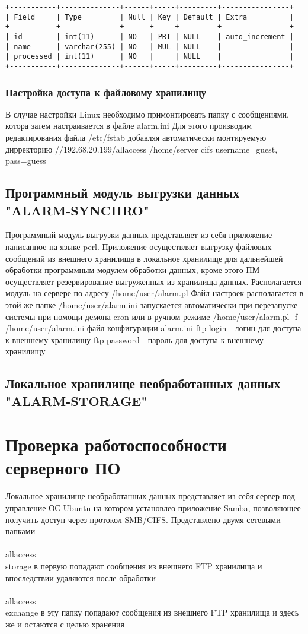 \documentclass[12pt]{article}[a4paper,14pt,russian]
\begin{document}
\begin{verbatim}
+-----------+--------------+------+-----+---------+----------------+
| Field     | Type         | Null | Key | Default | Extra          |
+-----------+--------------+------+-----+---------+----------------+
| id        | int(11)      | NO   | PRI | NULL    | auto_increment |
| name      | varchar(255) | NO   | MUL | NULL    |                |
| processed | int(11)      | NO   |     | NULL    |                |
+-----------+--------------+------+-----+---------+----------------+

\end{verbatim}
	\subsubsection{Настройка доступа к файловому хранилищу}
	В случае настройки Linux необходимо примонтировать папку с сообщениями, котора затем настраивается в файле alarm.ini
	Для этого производим редактирования файла /etc/fstab добавляя автоматически монтируемую дирректорию
	//192.68.20.199/allaccess /home/server cifs username=guest, pass=guess
	\subsection{Программный модуль выгрузки данных "ALARM-SYNCHRO"}
	Программный модуль выгрузки данных представляет из себя приложение написанное на языке perl. Приложение осуществляет выгрузку файловых сообщений из внешнего хранилища в локальное хранилище для дальнейшей обработки программным модулем обработки данных, кроме этого ПМ осуществляет резервирование выгруженных из хранилища данных.
	Располагается модуль на сервере по адресу
	/home/user/alarm.pl
	Файл настроек располагается в этой же папке 
	/home/user/alarm.ini
	запускается автоматически при перезапуске системы при помощи демона cron или в ручном режиме
	/home/user/alarm.pl -f /home/user/alarm.ini
    файл конфигурации alarm.ini
    ftp-login - логин для доступа к внешнему хранилищу
    ftp-password - пароль для доступа к внешнему хранилищу
	\subsection{Локальное хранилище необработанных данных "ALARM-STORAGE"}
	\section{Проверка работоспособности серверного ПО}
	Локальное хранилище необработанных данных представляет из себя сервер под управление ОС Ubuntu на котором установлео приложение Samba, позволяющее  получить доступ через протокол SMB/CIFS. Представлено двумя сетевыми папками
	\\<ip адрес сервера>\\allaccess\\storage
	в первую попадают сообщения из внешнего FTP хранилища и впоследствии удаляются после обработки
	\\<ip адрес сервера>\\allaccess\\exchange
	в эту папку попадают сообщения из внешнего FTP хранилища и здесь же и остаются
	с целью хранения
\end{document}
